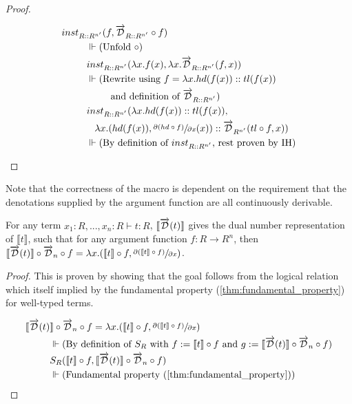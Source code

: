 \documentclass[11pt, final]{article}
\begin{document}
\begin{proof}
\begin{itemize}
      \begin{align*}
        inst&_{R :: R^{n'}}(f, \overrightarrow{\mathcal{D}}_{R :: R^{n'}} \circ f) \\
        & \;\;\; \Vdash \text{(Unfold $\circ$)} \\
        & \;\;\; inst_{R :: R^{n'}}(\lambda x. f(x), \lambda x. \overrightarrow{\mathcal{D}}_{R :: R^{n'}}( f, x)) \\
        & \;\;\; \Vdash \text{(Rewrite using $f = \lambda x. hd(f(x)) :: tl(f(x))$} \\
        & \;\;\;\;\;\;\;\;\;\;\;\; \text{and definition of $\overrightarrow{\mathcal{D}}_{R :: R^{n'}}$)} \\
        & \;\;\; inst_{R :: R^{n'}}(\lambda x. hd(f(x)) :: tl(f(x)), \\
        & \;\;\;\;\;\;
          \lambda x. (hd(f(x)), \sfrac{\partial{(hd \circ f)}}{\partial{x}}(x)) :: \overrightarrow{\mathcal{D}}_{R^{n'}}(tl \circ f, x)) \\
        & \;\;\; \Vdash \text{(By definition of $inst_{R :: R^{n'}}$, rest proven by IH)}
      \end{align*}
    \end{itemize}
  \end{proof}

  Note that the correctness of the macro is dependent on the requirement that the denotations supplied by the argument function are all continuously derivable.

  \begin{theorem}
    For any term $x_1 : R, ..., x_n : R \vdash t : R$, $\llbracket\overrightarrow{\mathcal{D}}(t)\rrbracket$ gives the dual number representation of $\llbracket t \rrbracket$, such that for any argument function $f : R \rightarrow R^n$, then $\llbracket \overrightarrow{\mathcal{D}}(t) \rrbracket \circ \overrightarrow{\mathcal{D}}_n \circ f = \lambda x. (\llbracket t \rrbracket \circ f, \sfrac{\partial{(\llbracket t \rrbracket \circ f)}}{\partial{x}})$.
  \end{theorem}

  \begin{proof}
    This is proven by showing that the goal follows from the logical relation which itself implied by the fundamental property (\ref{thm:fundamental_property}) for well-typed terms.

    \begin{align*}
      \llbracket \overrightarrow{\mathcal{D}}(t) &\rrbracket \circ \overrightarrow{\mathcal{D}}_n \circ f = \lambda x. (\llbracket t \rrbracket \circ f, \sfrac{\partial{(\llbracket t \rrbracket \circ f)}}{\partial{x}}) \\
      & \Vdash \text{(By definition of $S_R$ with $f := \llbracket t \rrbracket \circ f$ and $g := \llbracket \overrightarrow{\mathcal{D}}(t) \rrbracket \circ \overrightarrow{\mathcal{D}}_n \circ f$)} \\
      & S_R(\llbracket t \rrbracket \circ f, \llbracket \overrightarrow{\mathcal{D}}(t) \rrbracket \circ \overrightarrow{\mathcal{D}}_n \circ f) \\
      & \Vdash \text{(Fundamental property (\ref{thm:fundamental_property}))}
    \end{align*}
  \end{proof}
\end{document}
